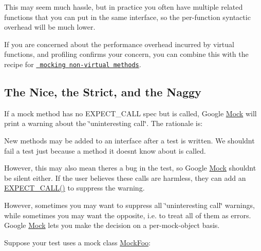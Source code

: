 This may seem much hassle, but in practice you often have multiple related functions that you can put in the same interface, so the per-\/function syntactic overhead will be much lower.

If you are concerned about the performance overhead incurred by virtual functions, and profiling confirms your concern, you can combine this with the recipe for \href{\#mocking-nonvirtual-methods}{\texttt{ mocking non-\/virtual methods}}.

\subsection*{The Nice, the Strict, and the Naggy}

If a mock method has no {\ttfamily E\+X\+P\+E\+C\+T\+\_\+\+C\+A\+LL} spec but is called, Google \mbox{\hyperlink{class_mock}{Mock}} will print a warning about the \char`\"{}uninteresting call\char`\"{}. The rationale is\+:


\begin{DoxyItemize}
\item New methods may be added to an interface after a test is written. We shouldn\textquotesingle{}t fail a test just because a method it doesn\textquotesingle{}t know about is called.
\item However, this may also mean there\textquotesingle{}s a bug in the test, so Google \mbox{\hyperlink{class_mock}{Mock}} shouldn\textquotesingle{}t be silent either. If the user believes these calls are harmless, they can add an {\ttfamily \mbox{\hyperlink{googletest-master_2googlemock_2include_2gmock_2gmock-spec-builders_8h_a535a6156de72c1a2e25a127e38ee5232}{E\+X\+P\+E\+C\+T\+\_\+\+C\+A\+L\+L()}}} to suppress the warning.
\end{DoxyItemize}

However, sometimes you may want to suppress all \char`\"{}uninteresting call\char`\"{} warnings, while sometimes you may want the opposite, i.\+e. to treat all of them as errors. Google \mbox{\hyperlink{class_mock}{Mock}} lets you make the decision on a per-\/mock-\/object basis.

Suppose your test uses a mock class {\ttfamily \mbox{\hyperlink{class_mock_foo}{Mock\+Foo}}}\+:


\begin{DoxyCode}{0}
\DoxyCodeLine{\}}
\end{DoxyCode}


